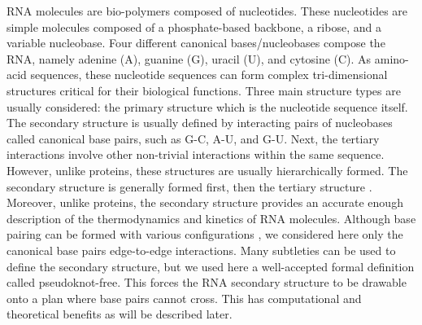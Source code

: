 \documentclass[a4paper,12pt]{article}
\begin{document}
RNA molecules are bio-polymers composed of nucleotides. These nucleotides are
simple molecules composed of a phosphate-based backbone, a ribose, and a
variable nucleobase. Four different canonical bases/nucleobases compose the RNA,
namely adenine (A), guanine (G), uracil (U), and cytosine (C). As amino-acid
sequences, these nucleotide sequences can form complex tri-dimensional
structures critical for their biological functions. Three main structure types
are usually considered: the primary structure which is the nucleotide sequence
itself. The secondary structure is usually defined by interacting pairs of
nucleobases called canonical base pairs, such as G-C, A-U, and G-U. Next, the
tertiary interactions involve other non-trivial interactions within the same
sequence. However, unlike proteins, these structures are usually hierarchically
formed. The secondary structure is generally formed first, then the tertiary
structure \cite{tinoco99_how_rna_folds}. Moreover, unlike proteins, the secondary
structure provides an accurate enough description of the thermodynamics and
kinetics of RNA molecules. Although base pairing can be formed with various
configurations \cite{leontis01_geomet_nomen_class_rna_base_pairs}, we considered
here only the canonical base pairs edge-to-edge interactions. Many subtleties
can be used to define the secondary structure, but we used here a well-accepted
formal definition called pseudoknot-free. This forces the RNA secondary
structure to be drawable onto a plan where base pairs cannot cross. This has
computational and theoretical benefits as will be described later.
\end{document}
